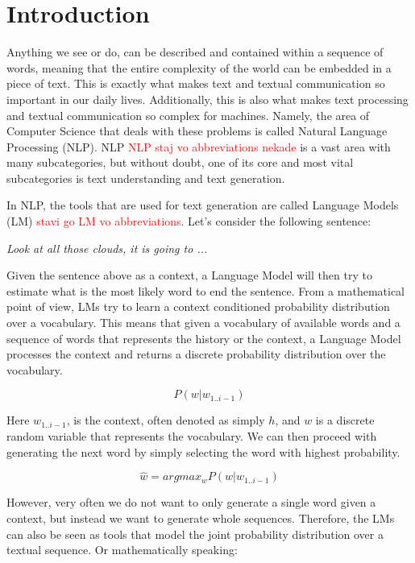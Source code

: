 \chapter{Introduction}

Anything we see or do, can be described and contained within a sequence of words, meaning that the entire complexity of the world can be embedded in a piece of text. This is exactly what makes text and textual communication so important in our daily lives. Additionally, this is also what makes text processing and textual communication so complex for machines. Namely, the area of Computer Science that deals with these problems is called Natural Language Processing (NLP). NLP \textcolor{red}{NLP staj vo abbreviations nekade} is a vast area with many subcategories, but without doubt, one of its core and most vital subcategories is text understanding and text generation.

In NLP, the tools that are used for text generation are called Language Models (LM) \textcolor{red}{stavi go LM vo abbreviations}. Let's consider the following sentence:

\begin{center}
    \emph{Look at all those clouds, it is going to ...}
\end{center}

Given the sentence above as a context, a Language Model will then try to estimate what is the most likely word to end the sentence. From a mathematical point of view, LMs try to learn a context conditioned probability distribution over a vocabulary. This means that given a vocabulary of available words and a sequence of words that represents the history or the context, a Language Model processes the context and returns a discrete probability distribution over the vocabulary. 

\begin{displaymath}
    P(w | w_{1..i-1})
\end{displaymath}

Here $w_{1..i-1}$, is the context, often denoted as simply $ h $, and $ w $ is a discrete random variable that represents the vocabulary. We can then proceed with generating the next word by simply selecting the word with highest probability.

\begin{displaymath}
    \hat{w} = argmax_w P(w | w_{1..i-1})
\end{displaymath}

However, very often we do not want to only generate a single word given a context, but instead we want to generate whole sequences. Therefore, the LMs can also be seen as tools that model the joint probability distribution over a textual sequence. Or mathematically speaking:

